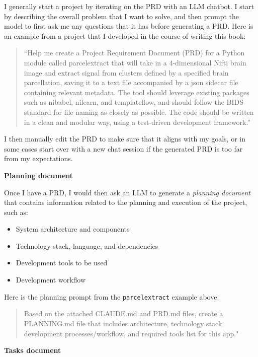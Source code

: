 I generally start a project by iterating on the PRD with an LLM chatbot.  I start by describing the overall problem that I want to solve, and then prompt the model to first ask me any questions that it has before generating a PRD.  Here is an example from a project that I developed in the course of writing this book:

\begin{quote}
``Help me create a Project Requirement Document (PRD) for a Python module called parcelextract that will take in a 4-dimensional Nifti brain image and extract signal from clusters defined by a specified brain parcellation, saving it to a text file accompanied by a json sidecar file containing relevant metadata.
The tool should leverage existing packages such as nibabel, nilearn, and templateflow, and should follow the BIDS standard for file naming as closely as possible.
The code should be written in a clean and modular way, using a test-driven development framework.''
\end{quote}

I then manually edit the PRD to make sure that it aligns with my goals, or in some cases start over with a new chat session if the generated PRD is too far from my expectations.

\textbf{Planning document}

Once I have a PRD, I would then ask an LLM to generate a \textit{planning document} that contains information related to the planning and execution of the project, such as:

\begin{itemize}
\item System architecture and components
\item Technology stack, language, and dependencies
\item Development tools to be used
\item Development workflow
\end{itemize}

Here is the planning prompt from the \texttt{parcelextract} example above:

\begin{quote}
Based on the attached CLAUDE.md and PRD.md files, create a PLANNING.md file that includes architecture, technology stack, development processes/workflow, and required tools list for this app."
\end{quote}

\textbf{Tasks document}

